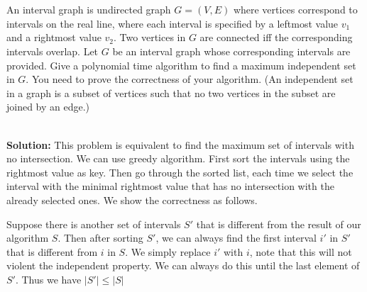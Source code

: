 

\section{}

An interval graph is undirected graph $G=(V,E)$ where vertices correspond to intervals on the real line, where each interval is specified by a leftmost value $v_1$ and a rightmost value $v_2$. Two vertices in $G$ are connected iff the corresponding intervals overlap. Let $G$ be an interval graph whose corresponding intervals are provided. Give a polynomial time algorithm to find a maximum independent set in $G$. You need to prove the correctness of your algorithm. (An independent set in a graph is a subset of vertices such that no two vertices in the subset are joined by an edge.)

\ \\{\bf Solution:} This problem is equivalent to find the maximum set of intervals with no intersection. We can use greedy algorithm. First sort the intervals using the rightmost value as key. Then go through the sorted list, each time we select the interval with the minimal rightmost value that has no intersection with the already selected ones. We show the correctness as follows.

Suppose there is another set of intervals $S'$ that is different from the result of our algorithm $S$. Then after sorting $S'$, we can always find the first interval $i'$ in $S'$ that is different from $i$ in $S$. We simply replace $i'$ with $i$, note that this will not violent the independent property. We can always do this until the last element of $S'$. Thus we have $|S'| \le |S|$